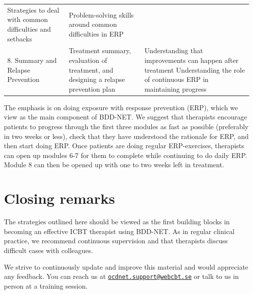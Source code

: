\documentclass[]{book}
\theoremstyle{definition}
\theoremstyle{definition}
\theoremstyle{definition}
\theoremstyle{remark}
\begin{document}
\begin{longtable}[]{@{}lll@{}}
\begin{minipage}[t]{0.33\columnwidth}
Strategies to deal with common difficulties and setbacks\strut
\end{minipage} & \begin{minipage}[t]{0.25\columnwidth}\raggedright
Problem-solving skills around common difficulties in ERP\strut
\end{minipage}\tabularnewline
\begin{minipage}[t]{0.33\columnwidth}\raggedright
8. Summary and Relapse Prevention\strut
\end{minipage} & \begin{minipage}[t]{0.33\columnwidth}\raggedright
Treatment summary, evaluation of treatment, and designing a relapse
prevention plan\strut
\end{minipage} & \begin{minipage}[t]{0.25\columnwidth}\raggedright
Understanding that improvements can happen after treatment Understanding
the role of continuous ERP in maintaining progress\strut
\end{minipage}\tabularnewline
\bottomrule
\end{longtable}

The emphasis is on doing exposure with response prevention (ERP), which
we view as the main component of BDD-NET. We suggest that therapists
encourage patients to progress through the first three modules as fast
as possible (preferably in two weeks or less), check that they have
understood the rationale for ERP, and then start doing ERP. Once
patients are doing regular ERP-exercises, therapists can open up modules
6-7 for them to complete while continuing to do daily ERP. Module 8 can
then be opened up with one to two weeks left in treatment.

\hypertarget{closing-remarks-1}{%
\section{Closing remarks}\label{closing-remarks-1}}

The strategies outlined here should be viewed as the first building
blocks in becoming an effective ICBT therapist using BDD-NET. As in
regular clinical practice, we recommend continuous supervision and that
therapists discuss difficult cases with colleagues.

We strive to continuously update and improve this material and would
appreciate any feedback. You can reach us at
\href{mailto:ocdnet.support@webcbt.se}{\nolinkurl{ocdnet.support@webcbt.se}}
or talk to us in person at a training session.
\end{document}
